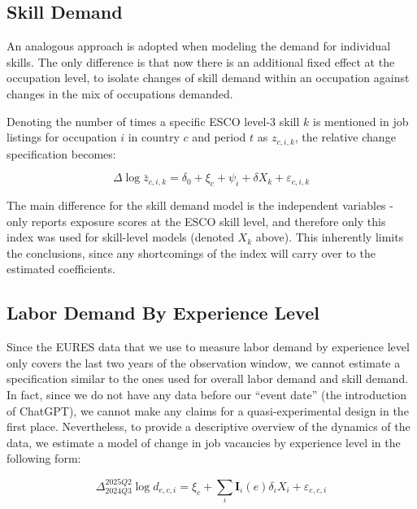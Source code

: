 \documentclass[11pt]{article}
\begin{document}
\subsection{Skill Demand}

An analogous approach is adopted when modeling the demand for individual skills. The only difference is that now there is an additional fixed effect at the occupation level, to isolate changes of skill demand within an occupation against changes in the mix of occupations demanded.

Denoting the number of times a specific ESCO level-3 skill $k$ is mentioned in job listings for occupation $i$ in country $c$ and period $t$ as $z_{c,i,k}$, the relative change specification becomes:

\begin{equation}
\Delta\log{\bar{z}}_{c,i,k} = \delta_0 + \xi_c + \psi_i +\delta X_{k}  + \varepsilon_{c,i,k}
\label{eq:skill}
\end{equation}

The main difference for the skill demand model is the independent variables - only \citet{demirev2024assessing} reports exposure scores at the ESCO skill level, and therefore only this index was used for skill-level models (denoted $X_k$ above). This inherently limits the conclusions, since any shortcomings of the index will carry over to the estimated coefficients.

\subsection{Labor Demand By Experience Level}

Since the EURES data that we use to measure labor demand by experience level only covers the last two years of the observation window, we cannot estimate a specification similar to the ones used for overall labor demand and skill demand. In fact, since we do not have any data before our ``event date'' (the introduction of ChatGPT), we cannot make any claims for a quasi-experimental design in the first place. Nevertheless, to provide a descriptive overview of the dynamics of the data, we estimate a model of change in job vacancies by experience level in the following form:

\begin{equation}
    \Delta_{2024Q3}^{2025Q2}\log{{d}_{e,c,i}} = \xi_c + \sum_{\iota}\mathbf{I}_{\iota}(e) \delta_{\iota} X_i + \varepsilon_{e,c,i}
\label{eq:experience}
\end{equation}
\end{document}

